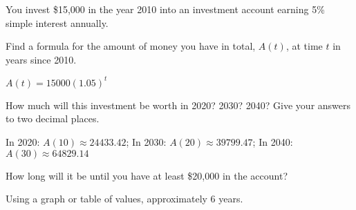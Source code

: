 \begin{exercises}
\begin{problem}[Investment]
You invest \$15,000 in the year 2010 into an investment account earning 
5\% simple interest annually.
\begin{subproblem}
	Find a formula for the amount of money you have in total, $A(t)$, at time 
	$t$ in years since 2010.
	\begin{shortsolution}
		$A(t)=15000(1.05)^t$
	\end{shortsolution}
\end{subproblem}
\begin{subproblem}
	How much will this investment be worth in 2020? 2030? 2040? Give your answers 
	to two decimal places.
	\begin{shortsolution}
		In 2020: $A(10)\approx 24433.42$; In 2030: $A(20)\approx 39799.47$; In 2040: $A(30)\approx 64829.14$
	\end{shortsolution}
\end{subproblem}
\begin{subproblem}
	How long will it be until you have at least \$20,000 in the account?
	\begin{shortsolution}
		Using a graph or table of values, approximately 6 years.
	\end{shortsolution}
\end{subproblem}
\end{problem}
			

\end{exercises}

